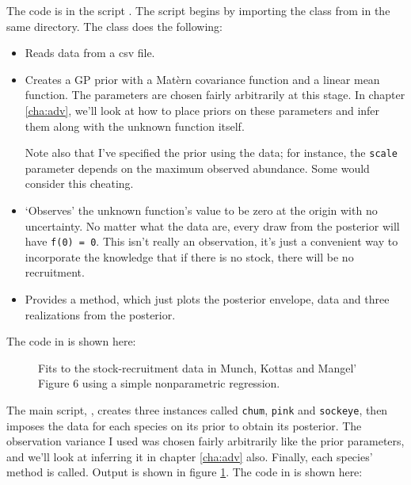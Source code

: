 \documentclass{manual}
\begin{document}
The code is in the script . The script begins by importing the  class from  in the same directory.
The  class does the following:
\begin{itemize}
    \item Reads data from a csv file.
    \item Creates a GP prior with a Mat\`ern covariance function and a linear mean function. The parameters are chosen fairly arbitrarily at this stage. In chapter \ref{cha:adv}, we'll look at how to place priors on these parameters and infer them along with the unknown function itself.
    
    Note also that I've specified the prior using the data; for instance, the \texttt{scale} parameter depends on the maximum observed abundance. Some would consider this cheating.
    \item `Observes' the unknown function's value to be zero at the origin with no uncertainty. No matter what the data are, every draw from the posterior will have \texttt{f(0) = 0}. This isn't really an observation, it's just a convenient way to incorporate the knowledge that if there is no stock, there will be no recruitment.
    \item Provides a  method, which just plots the posterior envelope, data and three realizations from the posterior.
\end{itemize}
The code in  is shown here: 


\begin{figure}
    \centering
    \caption{Fits to the stock-recruitment data in Munch, Kottas and Mangel' \cite{mmk} Figure 6 using a simple nonparametric regression.}
    \label{fig:MMKregression}
\end{figure}

The main script, , creates three  instances called \texttt{chum}, \texttt{pink} and \texttt{sockeye}, then imposes the data for each species on its prior to obtain its posterior. The observation variance I used was chosen fairly arbitrarily like the prior parameters, and we'll look at inferring it in chapter \ref{cha:adv} also. Finally, each species'  method is called. Output is shown in figure \ref{fig:MMKregression}.
The code in  is shown here:

\end{document}
